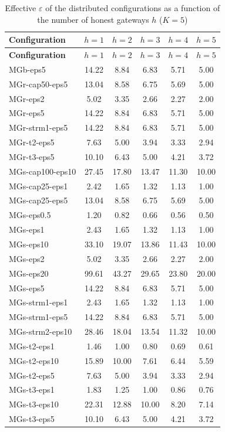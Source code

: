 \begin{longtable}{lccccc}
\caption{Effective $\varepsilon$ of the distributed configurations as a function of the number of honest gateways $h$ ($K = 5$)}\label{tab:app_honest}\\
\toprule
\textbf{Configuration} & $h = 1$ & $h = 2$ & $h = 3$ & $h = 4$ & $h = 5$ \\
\midrule
\endfirsthead
\toprule
\textbf{Configuration} & $h = 1$ & $h = 2$ & $h = 3$ & $h = 4$ & $h = 5$ \\
\midrule
\endhead
\bottomrule
\endfoot
MGb-eps5 & 14.22 & 8.84 & 6.83 & 5.71 & 5.00 \\
MGr-cap50-eps5 & 13.04 & 8.58 & 6.75 & 5.69 & 5.00 \\
MGr-eps2 & 5.02 & 3.35 & 2.66 & 2.27 & 2.00 \\
MGr-eps5 & 14.22 & 8.84 & 6.83 & 5.71 & 5.00 \\
MGr-strm1-eps5 & 14.22 & 8.84 & 6.83 & 5.71 & 5.00 \\
MGr-t2-eps5 & 7.63 & 5.00 & 3.94 & 3.33 & 2.94 \\
MGr-t3-eps5 & 10.10 & 6.43 & 5.00 & 4.21 & 3.72 \\
MGs-cap100-eps10 & 27.45 & 17.80 & 13.47 & 11.30 & 10.00 \\
MGs-cap25-eps1 & 2.42 & 1.65 & 1.32 & 1.13 & 1.00 \\
MGs-cap25-eps5 & 13.04 & 8.58 & 6.75 & 5.69 & 5.00 \\
MGs-eps0.5 & 1.20 & 0.82 & 0.66 & 0.56 & 0.50 \\
MGs-eps1 & 2.43 & 1.65 & 1.32 & 1.13 & 1.00 \\
MGs-eps10 & 33.10 & 19.07 & 13.86 & 11.43 & 10.00 \\
MGs-eps2 & 5.02 & 3.35 & 2.66 & 2.27 & 2.00 \\
MGs-eps20 & 99.61 & 43.27 & 29.65 & 23.80 & 20.00 \\
MGs-eps5 & 14.22 & 8.84 & 6.83 & 5.71 & 5.00 \\
MGs-strm1-eps1 & 2.43 & 1.65 & 1.32 & 1.13 & 1.00 \\
MGs-strm1-eps5 & 14.22 & 8.84 & 6.83 & 5.71 & 5.00 \\
MGs-strm2-eps10 & 28.46 & 18.04 & 13.54 & 11.32 & 10.00 \\
MGs-t2-eps1 & 1.46 & 1.00 & 0.80 & 0.69 & 0.61 \\
MGs-t2-eps10 & 15.89 & 10.00 & 7.61 & 6.44 & 5.59 \\
MGs-t2-eps5 & 7.63 & 5.00 & 3.94 & 3.33 & 2.94 \\
MGs-t3-eps1 & 1.83 & 1.25 & 1.00 & 0.86 & 0.76 \\
MGs-t3-eps10 & 22.31 & 12.88 & 10.00 & 8.20 & 7.14 \\
MGs-t3-eps5 & 10.10 & 6.43 & 5.00 & 4.21 & 3.72 \\
\end{longtable}
